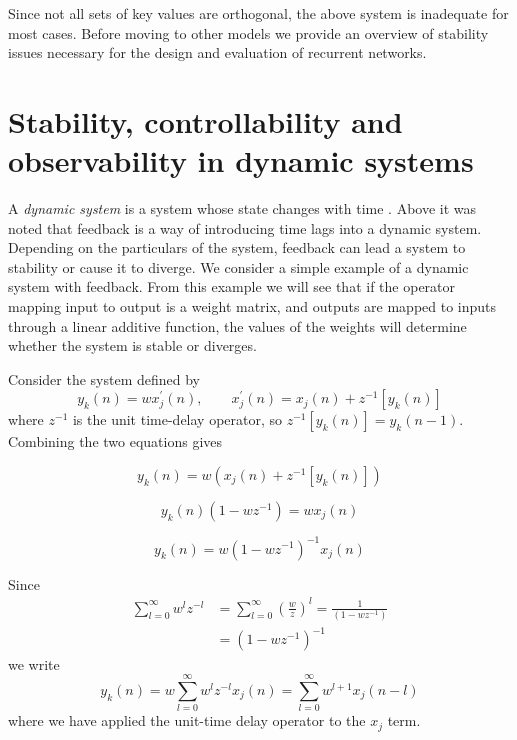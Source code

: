 Since not all sets of key values are orthogonal, the above system is inadequate for most cases. Before moving to other models we provide an overview of stability issues necessary for the design and evaluation of recurrent networks.

\section{Stability, controllability and observability in dynamic systems}

A \emph{dynamic system} is a system whose state changes with time \cite[p. 675]{Haykin:2009:NNC:1213811}. Above it was noted that feedback is a way of introducing time lags into a dynamic system. Depending on the particulars of the system, feedback can lead a system to stability or cause it to diverge. We consider a simple example \cite[p. 18-21]{Haykin:2009:NNC:1213811} of a dynamic system with feedback. From this example we will see that if the operator mapping input to output is a weight matrix, and outputs are mapped to inputs through a linear additive function, the values of the weights will determine whether the system is stable or diverges.

Consider the system defined by
%
\begin{equation*}
y_k(n) = wx_j^\prime(n), \qquad x_j^\prime(n) = x_j(n) + z^{-1}[y_k(n)]
\end{equation*}
%
where $z^{-1}$ is the unit time-delay operator, so $z^{-1}[y_k(n)] = y_k(n-1)$. Combining the two equations gives

\begin{equation*}
  y_k(n) = w \left(x_j(n) + z^{-1}[y_k(n)]\right)
\end{equation*}

\begin{equation*}
  y_k(n)(1 - wz^{-1}) = wx_j(n)
\end{equation*}

\begin{equation*}
  y_k(n) = w(1 - wz^{-1})^{-1}x_j(n)
\end{equation*}

Since
%
\begin{align*}
  \sum_{l=0}^{\infty}w^l z^{-l} & = \sum_{l=0}^{\infty}\left(\frac{w}{z}\right)^l = \frac{1}{(1 - wz^{-1})} \\
  & = (1 - wz^{-1})^{-1}
\end{align*}
%
we write
%
\begin{equation*}
  y_k(n) = w \sum_{l=0}^{\infty}w^l z^{-l}x_j(n) = \sum_{l=0}^{\infty}w^{l+1}x_j(n - l)
\end{equation*}
%
where we have applied the unit-time delay operator to the $x_j$ term.

